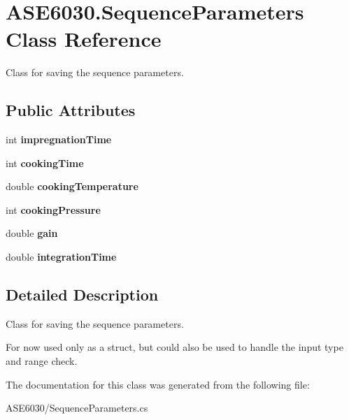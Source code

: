 \hypertarget{class_a_s_e6030_1_1_sequence_parameters}{}\section{A\+S\+E6030.\+Sequence\+Parameters Class Reference}
\label{class_a_s_e6030_1_1_sequence_parameters}


Class for saving the sequence parameters.  


\subsection*{Public Attributes}
\begin{DoxyCompactItemize}
\item 
\mbox{\label{class_a_s_e6030_1_1_sequence_parameters_a9f894780c256e1d4ccba4d528689db2d}} 
int {\bfseries impregnation\+Time}
\item 
\mbox{\label{class_a_s_e6030_1_1_sequence_parameters_a849f7bfb15f35ea4ca038f4c4e5f147c}} 
int {\bfseries cooking\+Time}
\item 
\mbox{\label{class_a_s_e6030_1_1_sequence_parameters_aa6ea81d58306fa849f0c15d1f4d2331c}} 
double {\bfseries cooking\+Temperature}
\item 
\mbox{\label{class_a_s_e6030_1_1_sequence_parameters_a3541c0320c22637b3566458078f2865d}} 
int {\bfseries cooking\+Pressure}
\item 
\mbox{\label{class_a_s_e6030_1_1_sequence_parameters_a54ef8f65093e929f9ba6eee0531502f6}} 
double {\bfseries gain}
\item 
\mbox{\label{class_a_s_e6030_1_1_sequence_parameters_ad949634825a6ec898ea53e5483a6ba50}} 
double {\bfseries integration\+Time}
\end{DoxyCompactItemize}


\subsection{Detailed Description}
Class for saving the sequence parameters. 

For now used only as a struct, but could also be used to handle the input type and range check. 

The documentation for this class was generated from the following file\+:\begin{DoxyCompactItemize}
\item 
A\+S\+E6030/Sequence\+Parameters.\+cs\end{DoxyCompactItemize}
